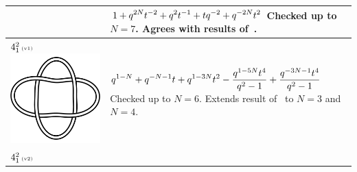 \documentclass{compositio}
\theoremstyle{definition}
\numberwithin{equation}{section}
\begin{document}
{\begin{longtable}{p{}|p{}}
& 
\newline
$
\displaystyle{%
1 + q^{2 N} t^{-2} + q^2 t^{-1} + t q^{-2} + q^{-2 N} t^2
}
$
\newline\newline\newline
Checked up to $N=7$. Agrees with results of~\cite{r0508510, r0607544}. 
\\
\hline
$4_{1}^2\,\text{{\tiny (v1)}}$ 
\includegraphics[scale=0.07,angle=0]{link4_1_2.pdf} 
& 
\newline
$
\displaystyle{%
q^{1-N}+q^{-N-1} t+q^{1-3 N} t^2-\frac{q^{1-5N} t^4}{q^2-1}+\frac{q^{-3 N-1} t^4}{q^2-1}
}
$
\newline\newline\newline
Checked up to $N=6$. Extends result of~\cite{r0508510} to $N=3$ and $N=4$. 
\\
\hline
$4_{1}^2\,\text{{\tiny (v2)}}$ 

\end{longtable}}
\end{document}
